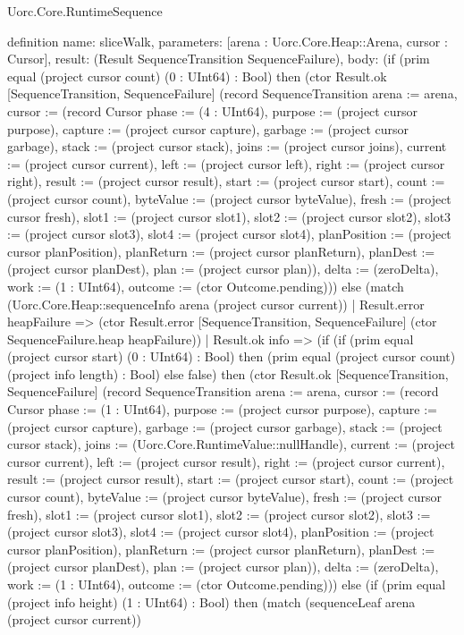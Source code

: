 \begin{lexlean}{Uorc.Core.RuntimeSequence}
\begin{semanticmodule}
definition{
  name: sliceWalk,
  parameters: [arena : Uorc.Core.Heap::Arena, cursor : Cursor],
  result: (Result SequenceTransition SequenceFailure),
  body: (if (prim equal (project cursor count) (0 : UInt64) : Bool) then (ctor Result.ok [SequenceTransition, SequenceFailure] (record SequenceTransition {arena := arena, cursor := (record Cursor {phase := (4 : UInt64), purpose := (project cursor purpose), capture := (project cursor capture), garbage := (project cursor garbage), stack := (project cursor stack), joins := (project cursor joins), current := (project cursor current), left := (project cursor left), right := (project cursor right), result := (project cursor result), start := (project cursor start), count := (project cursor count), byteValue := (project cursor byteValue), fresh := (project cursor fresh), slot1 := (project cursor slot1), slot2 := (project cursor slot2), slot3 := (project cursor slot3), slot4 := (project cursor slot4), planPosition := (project cursor planPosition), planReturn := (project cursor planReturn), planDest := (project cursor planDest), plan := (project cursor plan)}), delta := (zeroDelta), work := (1 : UInt64), outcome := (ctor Outcome.pending)})) else (match (Uorc.Core.Heap::sequenceInfo arena (project cursor current))
    | Result.error heapFailure => (ctor Result.error [SequenceTransition, SequenceFailure] (ctor SequenceFailure.heap heapFailure))
    | Result.ok info => (if (if (prim equal (project cursor start) (0 : UInt64) : Bool) then (prim equal (project cursor count) (project info length) : Bool) else false) then (ctor Result.ok [SequenceTransition, SequenceFailure] (record SequenceTransition {arena := arena, cursor := (record Cursor {phase := (1 : UInt64), purpose := (project cursor purpose), capture := (project cursor capture), garbage := (project cursor garbage), stack := (project cursor stack), joins := (Uorc.Core.RuntimeValue::nullHandle), current := (project cursor current), left := (project cursor result), right := (project cursor current), result := (project cursor result), start := (project cursor start), count := (project cursor count), byteValue := (project cursor byteValue), fresh := (project cursor fresh), slot1 := (project cursor slot1), slot2 := (project cursor slot2), slot3 := (project cursor slot3), slot4 := (project cursor slot4), planPosition := (project cursor planPosition), planReturn := (project cursor planReturn), planDest := (project cursor planDest), plan := (project cursor plan)}), delta := (zeroDelta), work := (1 : UInt64), outcome := (ctor Outcome.pending)})) else (if (prim equal (project info height) (1 : UInt64) : Bool) then (match (sequenceLeaf arena (project cursor current))
}
\end{semanticmodule}
\end{lexlean}
